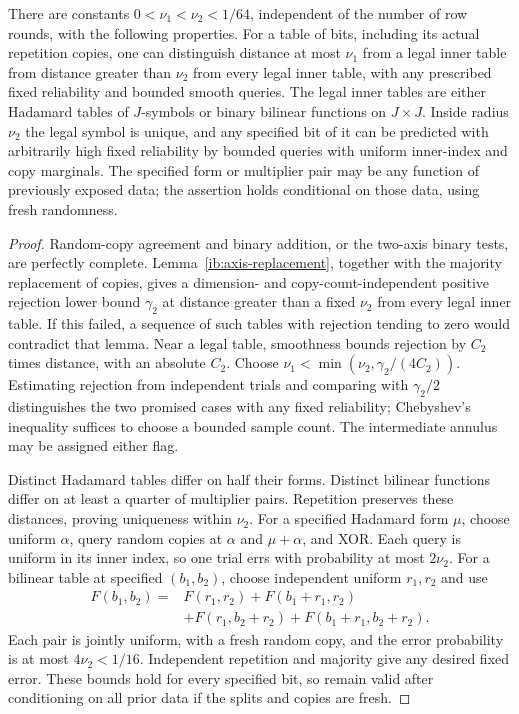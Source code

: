 \begin{lemma}
\label{ib:inner-table-prediction}
There are constants \(0<\nu_1<\nu_2<1/64\), independent of the
number of row rounds, with the following properties.  For a table
of bits, including its actual repetition copies, one can distinguish
distance at most \(\nu_1\) from a legal inner table from distance
greater than \(\nu_2\) from every legal inner table, with any
prescribed fixed reliability and bounded smooth queries.  The legal
inner tables are either Hadamard tables of \(J\)-symbols or binary
bilinear functions on \(J\times J\).  Inside radius \(\nu_2\)
the legal symbol is unique, and any specified bit of it can be
predicted with arbitrarily high fixed reliability by bounded queries
with uniform inner-index and copy marginals.  The specified form or
multiplier pair may be any function of previously exposed data;
the assertion holds conditional on those data, using fresh randomness.
\end{lemma}

\begin{proof}
Random-copy agreement and binary addition, or the two-axis binary
tests, are perfectly complete.  Lemma~\ref{ib:axis-replacement},
together with the majority replacement of copies, gives a
dimension- and copy-count-independent positive rejection lower
bound \(\gamma_2\) at distance greater than a fixed \(\nu_2\)
from every legal inner table.  If this failed, a sequence of such
tables with rejection tending to zero would contradict that lemma.
Near a legal table, smoothness bounds rejection by \(C_2\) times
distance, with an absolute \(C_2\).  Choose
\(\nu_1<\min(\nu_2,\gamma_2/(4C_2))\).  Estimating rejection
from independent trials and comparing with \(\gamma_2/2\)
distinguishes the two promised cases with any fixed reliability;
Chebyshev's inequality suffices to choose a bounded sample count.
The intermediate annulus may be assigned either flag.

Distinct Hadamard tables differ on half their forms.  Distinct
bilinear functions differ on at least a quarter of multiplier
pairs.  Repetition preserves these distances, proving uniqueness
within \(\nu_2\).  For a specified Hadamard form \(\mu\), choose
uniform \(\alpha\), query random copies at \(\alpha\) and
\(\mu+\alpha\), and XOR.  Each query is uniform in its inner
index, so one trial errs with probability at most \(2\nu_2\).
For a bilinear table at specified \((b_1,b_2)\), choose independent
uniform \(r_1,r_2\) and use
\begin{align*}
 F(b_1,b_2)={}&F(r_1,r_2)+F(b_1+r_1,r_2)\\
             &+F(r_1,b_2+r_2)+F(b_1+r_1,b_2+r_2).
\end{align*}
Each pair is jointly uniform, with a fresh random copy, and the
error probability is at most \(4\nu_2<1/16\).  Independent
repetition and majority give any desired fixed error.  These bounds
hold for every specified bit, so remain valid after conditioning
on all prior data if the splits and copies are fresh.
\end{proof}

